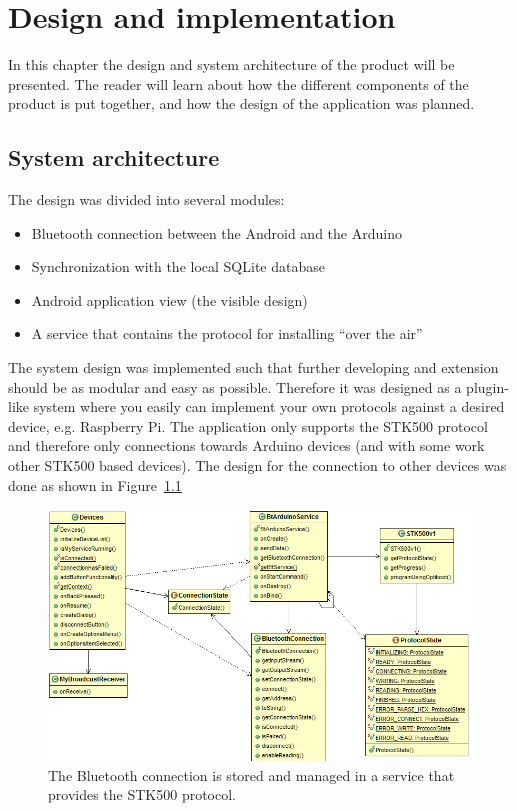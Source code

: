 \chapter{Design and implementation}
In this chapter the design and system architecture of the product will be presented. The reader will learn about how the different components of the product is put together, and how the design of the application was planned.

\section{System architecture}
	The design was divided into several modules:
	\begin{itemize}
		\item{Bluetooth connection between the Android and the Arduino}
		\item{Synchronization with the local SQLite database}
		\item{Android application view (the visible design)}
		\item{A service that contains the protocol for installing ``over the air''}
	\end{itemize}
	\vspace{0.2in}
	
	The system design was implemented such that further developing and extension should be as modular and easy as possible.
	Therefore it was designed as a plugin-like system where you easily can implement your own protocols against a desired device, e.g. Raspberry Pi. The application only supports the STK500 protocol and therefore only connections towards Arduino devices (and with some work other STK500 based devices).
	The design for the connection to other devices was done as shown in Figure~\ref{fig:btconnection_service_stk500}\\

	\begin{figure}[H]
	\centering
	\hspace*{-0.75in}
	\includegraphics[scale=0.85]{images/UML/btconnection_service_stk500.png}
	\caption[BT connection in service]{The Bluetooth connection is stored and managed in a service that provides the STK500 protocol.}
	\label{fig:btconnection_service_stk500}
	\end{figure}

